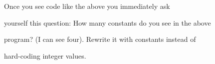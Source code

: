 Once you see code like the above you immediately ask

yourself this question: How many constants do you see in the above

program? (I can see four). Rewrite it with constants instead of

hard-coding integer values.

